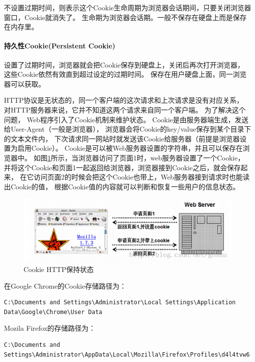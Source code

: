 \documentclass{book}
\begin{document}
不设置过期时间，则表示这个Cookie生命周期为浏览器会话期间，只要关闭浏览器窗口，Cookie就消失了。
生命期为浏览器会话期。一般不保存在硬盘上而是保存在内存里。

\paragraph{持久性Cookie(Persistent Cookie)}

设置了过期时间，浏览器就会把Cookie保存到硬盘上，关闭后再次打开浏览器，
这些Cookie依然有效直到超过设定的过期时间。
保存在用户硬盘上面，同一浏览器可以获取。

HTTP协议是无状态的，同一个客户端的这次请求和上次请求是没有对应关系，
对HTTP服务器来说，它并不知道这两个请求来自同一个客户端。 
为了解决这个问题， Web程序引入了Cookie机制来维护状态。
Cookie是由服务器端生成，发送给User-Agent（一般是浏览器），
浏览器会将Cookie的key/value保存到某个目录下的文本文件内，
下次请求同一网站时就发送该Cookie给服务器（前提是浏览器设置为启用Cookie）。
Cookie是可以被Web服务器设置的字符串，并且可以保存在浏览器中。
如图\ref{fig:CookieKeepStatus}所示，当浏览器访问了页面1时，web服务器设置了一个Cookie，
并将这个Cookie和页面1一起返回给浏览器，浏览器接到Cookie之后，就会保存起来，
在它访问页面2的时候会把这个Cookie也带上，Web服务器接到请求时也能读出Cookie的值，
根据Cookie值的内容就可以判断和恢复一些用户的信息状态。

\begin{figure}[htbp]
	\centering
	\includegraphics[scale=0.8]{CookieKeepStatus.jpg}
	\caption{Cookie HTTP保持状态}
	\label{fig:CookieKeepStatus}
\end{figure}

在Google Chrome的Cookie存储路径为：

\begin{lstlisting}
C:\Documents and Settings\Administrator\Local Settings\Application Data\Google\Chrome\User Data
\end{lstlisting}

Mozila Firefox的存储路径为：

\begin{lstlisting}
C:\Documents and Settings\Administrator\AppData\Local\Mozilla\Firefox\Profiles\d4l4tvw6.default\OfflineCache
\end{lstlisting}
\end{document}
